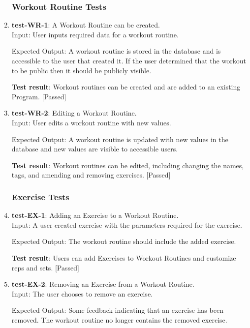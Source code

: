 \documentclass[12pt, titlepage]{article}
\begin{document}
\begin{enumerate}
   
\subsubsection{Workout Routine Tests}
    \item{\textbf{test-WR-1}}: A Workout Routine can be created.\\
    Input: User inputs required data for a workout routine.
	
    Expected Output: A workout routine is stored in the database and is accessible to the user that created it. If the user determined that the workout to be public then it should be publicly visible.
    
    \textbf{Test result}: Workout routines can be created and are added to an existing Program. [Passed]
   
    \item{\textbf{test-WR-2}}: Editing a Workout Routine.\\
    Input: User edits a workout routine with new values.
	
    Expected Output: A workout routine is updated with new values in the database and new values are visible to accessible users.
    
    \textbf{Test result}: Workout routines can be edited, including changing the names, tags, and amending and removing exercises. [Passed]
   
\subsubsection{Exercise Tests}
    \item{\textbf{test-EX-1}}: Adding an Exercise to a Workout Routine.\\
    Input: A user created exercise with the parameters required for the exercise.

    Expected Output: The workout routine should include the added exercise.
    
    \textbf{Test result}: Users can add Exercises to Workout Routines and customize reps and sets. [Passed]
   
    \item{\textbf{test-EX-2}}: Removing an Exercise from a Workout Routine.\\
    Input: The user chooses to remove an exercise.
	
    Expected Output: Some feedback indicating that an exercise has been removed. The workout routine no longer contains the removed exercise.
    

\end{enumerate}
\end{document}
